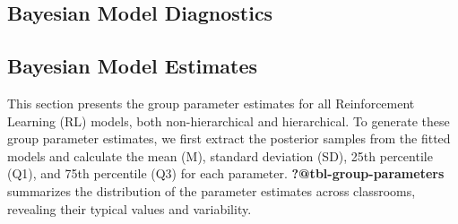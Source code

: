 \documentclass[
  number,
  preprint,
  3p,
  onecolumn]{elsarticle}
\begin{document}
\hypertarget{bayesian-model-diagnostics}{%
\subsection{Bayesian Model
Diagnostics}\label{bayesian-model-diagnostics}}

\begin{table}

\end{table}

\hypertarget{bayesian-model-estimates}{%
\subsection{Bayesian Model Estimates}\label{bayesian-model-estimates}}

This section presents the group parameter estimates for all
Reinforcement Learning (RL) models, both non-hierarchical and
hierarchical. To generate these group parameter estimates, we first
extract the posterior samples from the fitted models and calculate the
mean (M), standard deviation (SD), 25th percentile (Q1), and 75th
percentile (Q3) for each parameter. \textbf{?@tbl-group-parameters}
summarizes the distribution of the parameter estimates across
classrooms, revealing their typical values and variability.

\begin{table}

\end{table}
\end{document}
